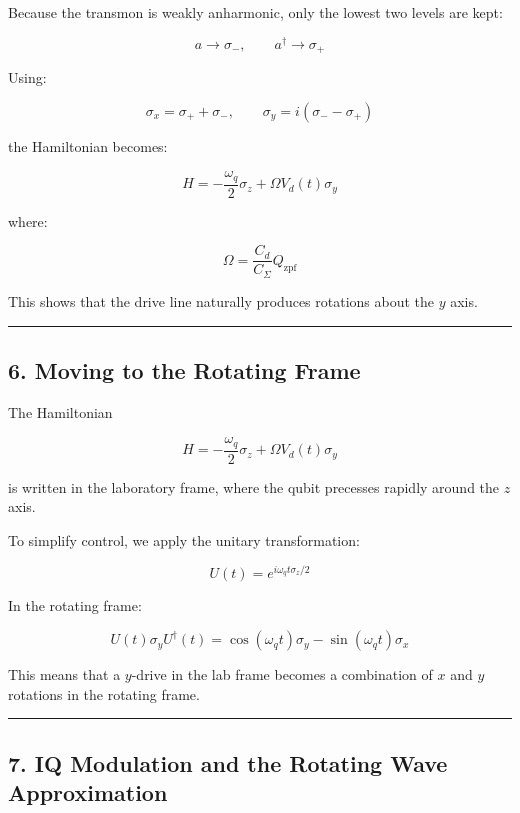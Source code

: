 \documentclass[
]{article}
\begin{document}
Because the transmon is weakly anharmonic, only the lowest two levels
are kept:

\[
a \rightarrow \sigma_-, \qquad a^\dagger \rightarrow \sigma_+
\]

Using:

\[
\sigma_x = \sigma_+ + \sigma_-, \qquad \sigma_y = i(\sigma_- - \sigma_+)
\]

the Hamiltonian becomes:

\[
H = -\frac{\omega_q}{2}\sigma_z + \Omega V_d(t)\sigma_y
\]

where:

\[
\Omega = \frac{C_d}{C_\Sigma}Q_{\text{zpf}}
\]

This shows that the drive line naturally produces rotations about the
\(y\) axis.

\begin{center}\rule{0.5\linewidth}{0.5pt}\end{center}

\subsection{6. Moving to the Rotating
Frame}\label{moving-to-the-rotating-frame}

The Hamiltonian

\[
H = -\frac{\omega_q}{2}\sigma_z + \Omega V_d(t)\sigma_y
\]

is written in the laboratory frame, where the qubit precesses rapidly
around the \(z\) axis.

To simplify control, we apply the unitary transformation:

\[
U(t) = e^{i\omega_q t \sigma_z / 2}
\]

In the rotating frame:

\[
U(t)\sigma_y U^\dagger(t) = \cos(\omega_q t)\sigma_y - \sin(\omega_q t)\sigma_x
\]

This means that a \(y\)-drive in the lab frame becomes a combination of
\(x\) and \(y\) rotations in the rotating frame.

\begin{center}\rule{0.5\linewidth}{0.5pt}\end{center}

\subsection{7. IQ Modulation and the Rotating Wave
Approximation}\label{iq-modulation-and-the-rotating-wave-approximation}
\end{document}
